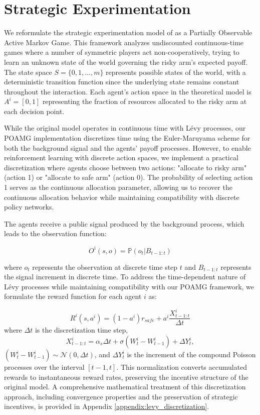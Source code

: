 \section{Strategic Experimentation}

We reformulate the strategic experimentation model of \citet{keller2020undiscounted} as a Partially Observable Active Markov Game. This framework analyzes undiscounted continuous-time games where a number of symmetric players act non-cooperatively, trying to learn an unknown state of the world governing the risky arm's expected payoff. The state space $S = \{0,1,\ldots,m\}$ represents possible states of the world, with a deterministic transition function since the underlying state remains constant throughout the interaction. Each agent's action space in the theoretical model is $A^i = [0,1]$ representing the fraction of resources allocated to the risky arm at each decision point.

While the original model operates in continuous time with Lévy processes, our POAMG implementation discretizes time using the Euler-Maruyama scheme \citep{kloeden1992numerical, platen1999introduction} for both the background signal and the agents' payoff processes. However, to enable reinforcement learning with discrete action spaces, we implement a practical discretization where agents choose between two actions: "allocate to risky arm" (action 1) or "allocate to safe arm" (action 0). The probability of selecting action 1 serves as the continuous allocation parameter, allowing us to recover the continuous allocation behavior while maintaining compatibility with discrete policy networks.

The agents receive a public signal produced by the background process, which leads to the observation function:

\begin{equation}
    O^i(s, o) = \mathbb{P}(o_t | B_{t-1:t})
\end{equation}

where $o_t$ represents the observation at discrete time step $t$ and $B_{t-1:t}$ represents the signal increment in discrete time. To address the time-dependent nature of Lévy processes while maintaining compatibility with our POAMG framework, we formulate the reward function for each agent $i$ as:

\begin{equation}
    R^i(s, a^i) = (1-a^i)r_\textit{safe} + a^i \frac{X^i_{t-1:t}}{\Delta t}
\end{equation}
where $\Delta t$ is the discretization time step,
\begin{equation}
    X^i_{t-1:t} = \alpha_s \Delta t + \sigma (W^i_t - W^i_{t-1}) + \Delta Y^i_t,
\end{equation}
$(W^i_t - W^i_{t-1}) \sim \mathcal{N}(0, \Delta t)$, and $\Delta Y^i_t$ is the increment of the compound Poisson processes over the interval $[t-1, t]$.
This normalization converts accumulated rewards to instantaneous reward rates, preserving the incentive structure of the original model. A comprehensive mathematical treatment of this discretization approach, including convergence properties and the preservation of strategic incentives, is provided in Appendix \ref{appendix:levy_discretization}.

